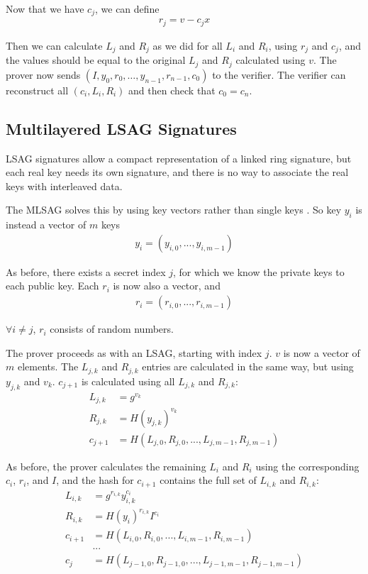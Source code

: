 \documentclass{article}
\begin{document}
Now that we have $c_j$, we can define
\begin{align}
  r_j = v - c_j x
\end{align}

Then we can calculate $L_j$ and $R_j$ as we did for all $L_i$ and $R_i$, using $r_j$ and $c_j$, and the values should be equal to the original $L_j$ and $R_j$ calculated using $v$. The prover now sends $(I, y_0, r_0, …, y_{n-1}, r_{n-1}, c_0)$ to the verifier.  The verifier can reconstruct all $(c_i, L_i, R_i)$ and then check that $c_0 = c_n$.


\subsection{Multilayered LSAG Signatures}

LSAG signatures allow a compact representation of a linked ring signature, but each real key needs its own signature, and there is no way to associate the real keys with interleaved data.

The MLSAG solves this by using key vectors rather than single keys \cite{ringct}.  So key $y_i$ is instead a vector of $m$ keys
\begin{align}
  y_i = (y_{i,0}, ..., y_{i,m-1})
\end{align}

As before, there exists a secret index $j$, for which we know the private keys to each public key.  Each $r_i$ is now also a vector, and
\begin{align}
  r_i = (r_{i,0}, ..., r_{i,m-1})
\end{align}

$\forall i \ne j$, $r_i$ consists of random numbers.

The prover proceeds as with an LSAG, starting with index $j$.  $v$ is now a vector of $m$ elements.  The $L_{j,k}$ and $R_{j,k}$ entries are calculated in the same way, but using $y_{j,k}$ and $v_k$.  $c_{j+1}$ is calculated using all $L_{j,k}$ and $R_{j,k}$:
\begin{align}
  L_{j,k} &= g^{v_k}\\
  R_{j,k} &= H(y_{j,k})^{v_k}\\
  c_{j+1} &= H(L_{j,0}, R_{j,0}, ..., L_{j,m-1}, R_{j,m-1})
\end{align}

As before, the prover calculates the remaining $L_i$ and $R_i$ using the corresponding $c_i$, $r_i$, and $I$, and the hash for $c_{i+1}$ contains the full set of $L_{i,k}$ and $R_{i,k}$:
\begin{align}
  L_{i,k} &= g^{r_{i,k}} y_{i,k}^{c_i}\\
  R_{i,k} &= H(y_i)^{r_{i,k}} I^{c_i}\\
  c_{i+1} &= H(L_{i,0}, R_{i,0}, ..., L_{i,m-1}, R_{i,m-1}) \\
  &... \\
  c_j &= H(L_{j-1,0}, R_{j-1,0}, ..., L_{j-1,m-1}, R_{j-1,m-1}) 
\end{align}
\end{document}
